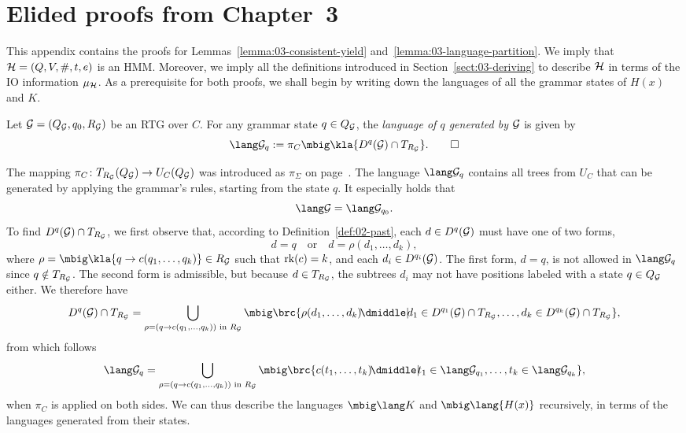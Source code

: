 \section{Elided proofs from Chapter~3}\label{sec:appendix-hk-proofs}

This appendix contains the proofs for Lemmas~\ref{lemma:03-consistent-yield}
and~\ref{lemma:03-language-partition}. We imply that $\mathcal H = (Q,V,\#,t,e)$ is an
HMM. Moreover, we imply all the definitions introduced in
Section~\ref{sect:03-deriving} to describe $\mathcal H$ in terms of the IO information $\mu_\mathcal H$.
As a prerequisite for both proofs, we shall begin by writing down the languages
of all the grammar states of $H(x)$ and $K$.

\begin{definition}
 Let $\mathcal G = (Q_\mathcal G,q_0,R_\mathcal G)$ be an RTG over $C$. For any grammar state $q\in
 Q_\mathcal G$, the \emph{language of $q$ generated by $\mathcal G$} is given by
 \[
  \lang\ug_q := \pi_C\mbig\kla{D^q(\ug)\cap T_{R_\ug}}.
  \qedhere
 \]
\end{definition}

The mapping $\pi_C\colon T_{R_\mathcal G}(Q_\mathcal G)\to U_C(Q_\mathcal G)$ was introduced as $\pi_\Sigma$ on
page~\pageref{def:02-pi-sigma}. The language $\lang\ug_q$ contains all trees
from $U_C$ that can be generated by applying the grammar's rules, starting from
the state $q$. It especially holds that
\begin{equation}\label{eq:a1}
 \lang\ug = \lang\ug_{q_0}.
\end{equation}
To find $D^q(\mathcal G)\cap T_{R_\mathcal G}$, we first observe that, according to
Definition~\ref{def:02-past}, each $d\in D^q(\mathcal G)$ must have one of two forms,
\[
 d = q \quad\text{or}\quad d = \rho(d_1,\ldots,d_k),
\]
where $\rho=\mbig\kla{q\to c(q_1,\ldots,q_k)}\in R_\ug$ such that $\operatorname{rk}(c) = k$, and
each $d_i\in D^{q_i}(\mathcal G)$. The first form, $d = q$, is not allowed in
$\lang\ug_q$ since $q\notin T_{R_\mathcal G}$. The second form is admissible, but
because $d\in T_{R_\mathcal G}$, the subtrees $d_i$ may not have positions labeled with
a state $q\in Q_\mathcal G$ either. We therefore have
\[
 D^q(\ug)\cap T_{R_\ug} = \bigcup_{\rho=(q\to c(q_1,\ldots,q_k))\isin R_\ug}
 \mbig\brc{\rho(d_1,\ldots,d_k) \npipe d_1\in D^{q_1}(\ug)\cap T_{R_\ug},\ldots, d_k\in D^{q_k}(\ug)\cap T_{R_\ug}},
\]
from which follows
\begin{equation}
 \label{eq:a2}
 \lang\ug_q = \bigcup_{\rho=(q\to c(q_1,\ldots,q_k))\isin R_\ug}
 \mbig\brc{c(t_1,\ldots,t_k) \npipe t_1\in\lang\ug_{q_1},\ldots, t_k\in\lang\ug_{q_k}},
\end{equation}
when $\pi_C$ is applied on both sides. We can thus describe the languages
$\mbig\lang K$ and $\mbig\lang{H(x)}$ recursively, in terms of the languages
generated from their states.


